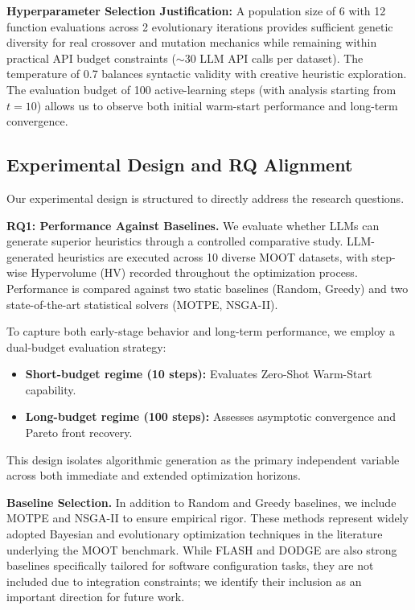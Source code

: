 \documentclass[sigconf,nonacm]{acmart}
\begin{document}
\textbf{Hyperparameter Selection Justification:} A population size of 6 with 12 function evaluations across 2 evolutionary iterations provides sufficient genetic diversity for real crossover and mutation mechanics while remaining within practical API budget constraints ($\sim$30 LLM API calls per dataset). The temperature of 0.7 balances syntactic validity with creative heuristic exploration. The evaluation budget of 100 active-learning steps (with analysis starting from $t=10$) allows us to observe both initial warm-start performance and long-term convergence.
\subsection{Experimental Design and RQ Alignment}

Our experimental design is structured to directly address the research questions.

\textbf{RQ1: Performance Against Baselines.}
We evaluate whether LLMs can generate superior heuristics through a controlled comparative study. LLM-generated heuristics are executed across 10 diverse MOOT datasets, with step-wise Hypervolume (HV) recorded throughout the optimization process. Performance is compared against two static baselines (Random, Greedy) and two state-of-the-art statistical solvers (MOTPE, NSGA-II).

To capture both early-stage behavior and long-term performance, we employ a dual-budget evaluation strategy:
\begin{itemize}
    \item \textbf{Short-budget regime (10 steps):} Evaluates Zero-Shot Warm-Start capability.
    \item \textbf{Long-budget regime (100 steps):} Assesses asymptotic convergence and Pareto front recovery.
\end{itemize}
This design isolates algorithmic generation as the primary independent variable across both immediate and extended optimization horizons.

\textbf{Baseline Selection.}
In addition to Random and Greedy baselines, we include MOTPE and NSGA-II to ensure empirical rigor. These methods represent widely adopted Bayesian and evolutionary optimization techniques in the literature underlying the MOOT benchmark. While FLASH and DODGE are also strong baselines specifically tailored for software configuration tasks, they are not included due to integration constraints; we identify their inclusion as an important direction for future work.
\end{document}
